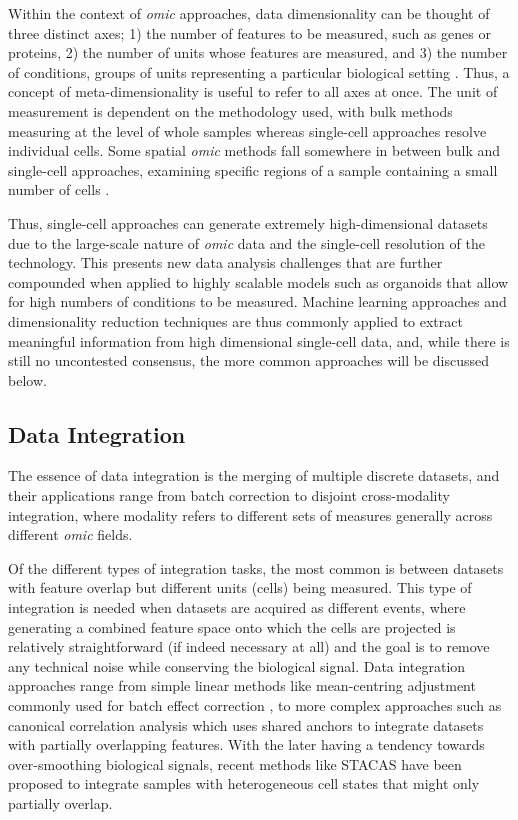 Within the context of \emph{omic} approaches, data dimensionality can be thought of three distinct axes; 1) the number of features to be measured, such as genes or proteins, 2) the number of units whose features are measured, and 3) the number of conditions, groups of units representing a particular biological setting \cite{qin_deciphering_2020}. Thus, a concept of meta-dimensionality is useful to refer to all axes at once.
The unit of measurement is dependent on the methodology used, with bulk methods measuring at the level of whole samples whereas single-cell approaches resolve individual cells. Some spatial \emph{omic} methods fall somewhere in between bulk and single-cell approaches, examining specific regions of a sample containing a small number of cells \cite{vickovic_high-definition_2019,marx_method_2021, williams_introduction_2022}.

Thus, single-cell approaches can generate extremely high-dimensional datasets due to the large-scale nature of \emph{omic} data and the single-cell resolution of the technology. This presents new data analysis challenges that are further compounded when applied to highly scalable models such as organoids that allow for high numbers of conditions to be measured. Machine learning approaches and dimensionality reduction techniques are thus commonly applied to extract meaningful information from high dimensional single-cell data, and, while there is still no uncontested consensus, the more common approaches will be discussed below.


\subsection{Data Integration}

The essence of data integration is the merging of multiple discrete datasets, and their applications range from batch correction to disjoint cross-modality integration, where modality refers to different sets of measures generally across different \emph{omic} fields.

Of the different types of integration tasks, the most common is between datasets with feature overlap but different units (cells) being measured. This type of integration is needed when datasets are acquired as different events, where generating a combined feature space onto which the cells are projected is relatively straightforward (if indeed necessary at all) and the goal is to remove any technical noise while conserving the biological signal. Data integration approaches range from simple linear methods like mean-centring adjustment commonly used for batch effect correction \cite{hornung_combining_2016}, to more complex approaches such as canonical correlation analysis \cite{butler_integrating_2018} which uses shared anchors to integrate datasets with partially overlapping features. With the later having a tendency towards over-smoothing biological signals, recent methods like STACAS \cite{andreatta_stacas_2021} have been proposed to integrate samples with heterogeneous cell states that might only partially overlap.

